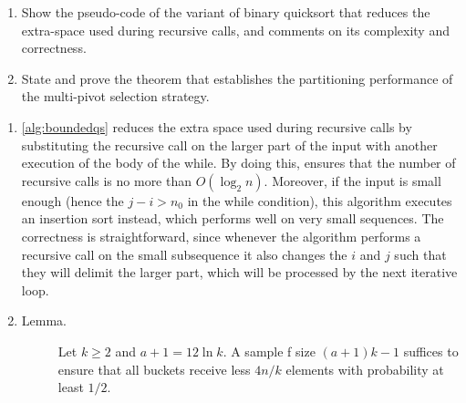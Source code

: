 \exercise

\begin{enumerate}

  \item Show the pseudo-code of the variant of binary quicksort that reduces the
  extra-space used during recursive calls, and comments on its complexity and
  correctness.

  \item State and prove the theorem that establishes the partitioning
  performance of the multi-pivot selection strategy.

\end{enumerate}

\solution

\begin{enumerate}

  \item \autoref{alg:boundedqs} reduces the extra space used during recursive
  calls by substituting the recursive call on the larger part of the input with
  another execution of the body of the while. By doing this, ensures that the
  number of recursive calls is no more than $O(\log_2 n)$. Moreover, if the
  input is small enough (hence the $j - i > n_0$ in the while condition), this
  algorithm executes an insertion sort instead, which performs well on very
  small sequences. The correctness is straightforward, since whenever the
  algorithm performs a recursive call on the small subsequence it also changes
  the $i$ and $j$ such that they will delimit the larger part, which will be
  processed by the next iterative loop.

  \item \begin{description}

    \item[Lemma.] Let $k \ge 2$ and $a + 1 = 12 \ln k$. A sample f size $(a +
    1)k - 1$ suffices to ensure that all buckets receive less $4n/k$
    elements with probability at least $1/2$.


\end{description}
\end{enumerate}
